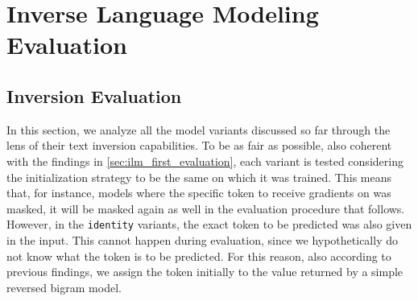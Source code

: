\documentclass[../thesis.tex]{subfiles}
\begin{document}
\chapter{Inverse Language Modeling Evaluation}

\section{Inversion Evaluation}
\label{sec:ilm_complete_evaluation}
In this section, we analyze all the model variants discussed so far through the lens of their text inversion capabilities.
To be as fair as possible, also coherent with the findings in \cref{sec:ilm_first_evaluation}, each variant is tested considering the initialization strategy to be the same on which it was trained.
This means that, for instance, models where the specific token to receive gradients on was masked, it will be masked again as well in the evaluation procedure that follows.
However, in the \texttt{identity} variants, the exact token to be predicted was also given in the input. This cannot happen during evaluation, since we hypothetically do not know what the token is to be predicted. For this reason, also according to previous findings, we assign the token initially to the value returned by a simple reversed bigram model.
\end{document}
